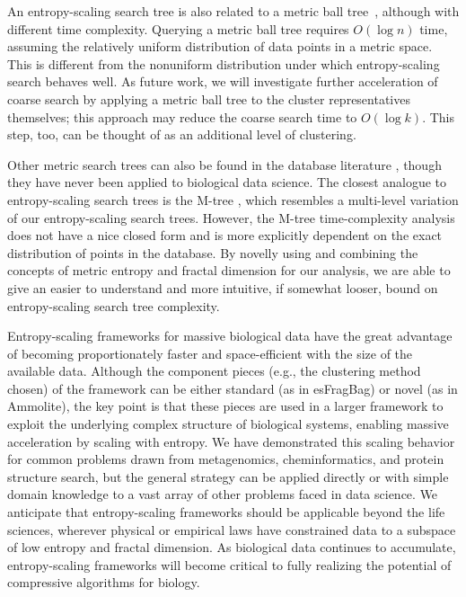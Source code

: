 \documentclass[review,preprint,12pt]{elsarticle}
\renewcommand{\cite}{\citep} %
\theoremstyle{definition}
\theoremstyle{remark}
\numberwithin{equation}{section}
\begin{document}
An entropy-scaling search tree is also related to a metric ball tree~\cite{uhlmann1991satisfying}, although with different time complexity.
Querying a metric ball tree requires $O(\log n)$ time, assuming the relatively uniform distribution of data points in a metric space.
This is different from the nonuniform distribution under which entropy-scaling
search behaves well.
As future work, we will investigate further acceleration of coarse search by
applying a metric ball tree to the cluster representatives themselves; this
approach may reduce the coarse search time to $O(\log k)$.
This step, too, can be thought of as an additional level of clustering.

Other metric search trees can also be found in the database literature \cite{zezula2006similarity}, though they have never been applied to biological data science.
The closest analogue to entropy-scaling search trees is the M-tree \cite{ciaccia1997deis,ciaccia1998cost}, which resembles a multi-level variation of our entropy-scaling search trees.
However, the M-tree time-complexity analysis \cite{ciaccia1998cost} does not have a nice closed form and is more explicitly dependent on the exact distribution of points in the database.
By novelly using and combining the concepts of metric entropy and fractal dimension for our analysis, we are able to give an easier to understand and more intuitive, if somewhat looser, bound on entropy-scaling search tree complexity.

Entropy-scaling frameworks for massive biological data have the great
advantage of becoming proportionately faster and space-efficient with the
size of the available data.
Although the component pieces (e.g., the clustering method chosen) of the framework can be either standard (as in esFragBag) or novel (as in Ammolite), the key point is that these pieces are used in a larger framework to exploit the underlying complex structure of biological systems, enabling massive acceleration by scaling with entropy.
We have demonstrated this scaling behavior for common problems drawn from
metagenomics, cheminformatics, and protein structure search, but the general strategy can be applied
directly or with simple domain knowledge to a vast array of other problems
faced in data science.
We anticipate that entropy-scaling frameworks should be applicable beyond
the life sciences, wherever physical or empirical laws have constrained data to 
a subspace of low entropy and fractal dimension.
As biological data continues to accumulate, entropy-scaling frameworks
will become critical to fully realizing the potential of compressive
algorithms for biology. 
\end{document}
